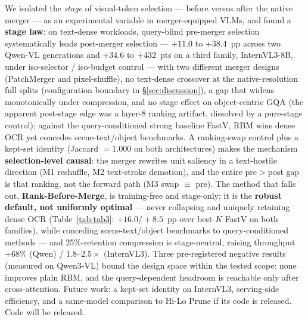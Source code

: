 \documentclass[sigconf,review,anonymous]{acmart}
\begin{document}
We isolated the \emph{stage} of visual-token selection --- before versus after
the native merger --- as an experimental variable in merger-equipped VLMs, and
found a \textbf{stage law}: on text-dense workloads, query-blind pre-merger
selection systematically leads post-merger selection --- $+11.0$ to $+38.4$~pp
across two Qwen-VL generations and $+34.6$ to $+432$~pts on a third family,
InternVL3-8B, under iso-selector / iso-budget control --- with two different
merger designs (PatchMerger and pixel-shuffle), no text-dense crossover at the
native-resolution full splits (configuration boundary in \S\ref{sec:discussion}),
a gap that widens monotonically under compression, and no stage effect on
object-centric GQA (the apparent post-stage edge was a layer-8 ranking
artifact, dissolved by a pure-stage control); against the query-conditioned strong
baseline FastV, RBM wins dense OCR yet concedes scene-text/object benchmarks. A ranking-swap control plus a kept-set identity (Jaccard $= 1.000$
on both architectures) makes the mechanism \textbf{selection-level causal}: the
merger rewrites unit saliency in a text-hostile direction (M1 reshuffle, M2
text-stroke demotion), and the entire pre$>$post gap is that ranking, not the
forward path (M3 swap $\equiv$ pre). The method that falls out,
\textbf{Rank-Before-Merge}, is training-free and stage-only; it is the
\textbf{robust default, not uniformly optimal} --- never collapsing and uniquely
retaining dense OCR (Table~\ref{tab:tab3}: $+16.0 / +8.5$~pp over best-$K$ FastV
on both families), while conceding scene-text/object benchmarks to
query-conditioned methods --- and 25\%-retention compression is stage-neutral,
raising throughput $+68\%$ (Qwen) / $1.8$--$2.5\times$ (InternVL3). Three
pre-registered negative results (measured on Qwen3-VL) bound the design space
within the tested scope: none improves plain RBM, and the query-dependent
headroom is reachable only after
cross-attention. Future work: a kept-set identity on InternVL3, serving-side
efficiency, and a same-model comparison to Hi-Lo Prune if its code is released.
Code will be released.



\end{document}
